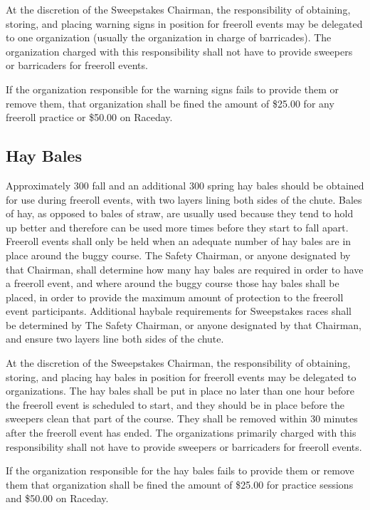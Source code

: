 	At the discretion of the Sweepstakes Chairman, the responsibility of obtaining,
	storing, and placing warning signs in position for freeroll events may be
	delegated to one organization (usually the organization in charge of
	barricades). The organization charged with this responsibility shall not have
	to provide sweepers or barricaders for freeroll events.

	If the organization responsible for the warning signs fails to provide them or
	remove them, that organization shall be fined the amount of \$25.00 for any 
	freeroll practice or \$50.00 on Raceday.
	
	
\subsection{Hay Bales}

	Approximately 300 fall and an additional 300 spring hay bales should be 
	obtained for use during freeroll events, with two layers lining both sides 
	of the chute. Bales of hay, as opposed to bales of straw, are usually used 
	because they tend to hold up better and therefore can be used more times before 
	they start to fall apart. Freeroll events shall only be held when an adequate 
	number of hay bales are in place around the buggy course. The Safety Chairman, 
	or anyone designated by that Chairman, shall determine how many hay bales are 
	required in order to have a freeroll event, and where around the buggy course 
	those hay bales shall be placed, in order to provide the maximum amount of 
	protection to the freeroll event participants. Additional haybale requirements 
	for Sweepstakes races shall be determined by The Safety Chairman, or anyone 
	designated by that Chairman, and ensure two layers line both sides of the chute.

	At the discretion of the Sweepstakes Chairman, the responsibility of obtaining,
	storing, and placing hay bales in position for freeroll events may be
	delegated to organizations. The hay bales shall be put in place no later
	than one hour before the freeroll event is scheduled to start, and they
	should be in place before the sweepers clean that part of the course. They
	shall be removed within 30 minutes after the freeroll event has ended. The
	organizations primarily charged with this responsibility shall not have to 
	provide sweepers or barricaders for freeroll events.

	If the organization responsible for the hay bales fails to provide them or
	remove them that organization shall be fined the amount of \$25.00 for 
	practice sessions and \$50.00 on Raceday.
	
